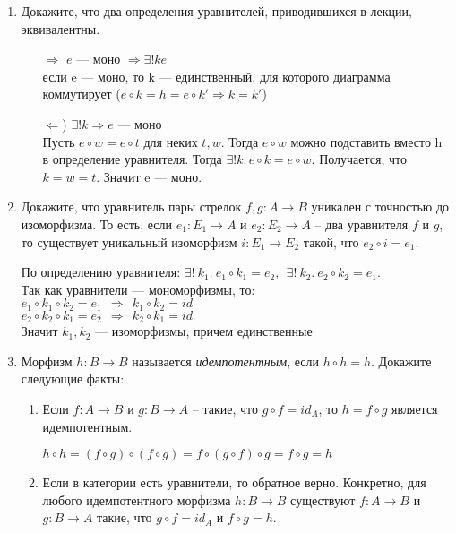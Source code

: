 \documentclass[draft]{article}
\begin{document}
\begin{enumerate}
\item Докажите, что два определения уравнителей, приводившихся в лекции, эквивалентны.

\begin{itemize}
\item[$\Rightarrow$]$e$ --- моно $ \Rightarrow  \exists!ke$\\ если e — моно, то k — единственный, для которого диаграмма коммутирует ($e \circ k = h = e \circ k'\Rightarrow k = k'$)
\item[$\Leftarrow$)] $\exists!k \Rightarrow e$ --- моно\\
Пусть $e \circ w = e \circ t$ для неких $t, w$. Тогда $e \circ w$ можно подставить вместо h в определение уравнителя. Тогда $\exists! k: e\circ k = e \circ w$. Получается, что $k = w = t$. Значит e --- моно.
\end{itemize}

\item Докажите, что уравнитель пары стрелок $f,g : A \to B$ уникален с точностью до изоморфизма.
То есть, если $e_1 : E_1 \to A$ и $e_2 : E_2 \to A$ -- два уравнителя $f$ и $g$, то существует уникальный изоморфизм $i : E_1 \to E_2$ такой, что $e_2 \circ i = e_1$.

По определению уравнителя: $\exists! ~k_1.~e_1\circ k_1 = e_2, ~~\exists! ~k_2.~e_2\circ k_2 = e_1$.\\
Так как уравнители --- мономорфизмы, то:\\
$e_1\circ k_1 \circ k_2 = e_1 ~~\Rightarrow~~ k_1 \circ k_2 = id$\\
$e_2\circ k_2 \circ k_1 = e_2 ~~\Rightarrow~~ k_2 \circ k_1 = id$\\
Значит $k_1, k_2$ --- изоморфизмы, причем единственные

\item Морфизм $h : B \to B$ называется \emph{идемпотентным}, если $h \circ h = h$.
Докажите следующие факты:
\begin{enumerate}
\item Если $f : A \to B$ и $g : B \to A$ -- такие, что $g \circ f = id_A$, то $h = f \circ g$ является идемпотентным. 

$h \circ h = (f \circ g)\circ (f\circ g) = f \circ (g\circ f)\circ g = f \circ g = h$
\item Если в категории есть уравнители, то обратное верно.
Конкретно, для любого идемпотентного морфизма $h : B \to B$ существуют $f : A \to B$ и $g : B \to A$ такие, что $g \circ f = id_A$ и $f \circ g = h$.\\


\end{enumerate}
\end{enumerate}
\end{document}
